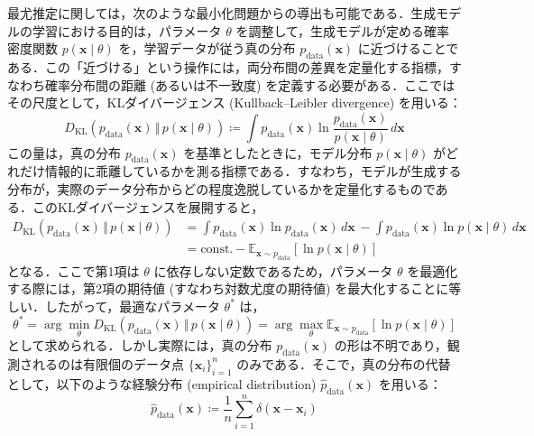 \documentclass[titlepage]{ltjsbook}
\begin{document}
最尤推定に関しては，次のような最小化問題からの導出も可能である．生成モデルの学習における目的は，パラメータ $\theta$ を調整して，生成モデルが定める確率密度関数 $p(\mathbf{x} \mid \theta)$ を，学習データが従う真の分布 $p_{\mathrm{data}}(\mathbf{x})$ に近づけることである．この「近づける」という操作には，両分布間の差異を定量化する指標，すなわち確率分布間の距離 (あるいは不一致度) を定義する必要がある．ここではその尺度として，KLダイバージェンス (Kullback–Leibler divergence) を用いる：
\begin{equation}
D_{\mathrm{KL}}\left(p_{\mathrm{data}}(\mathbf{x}) \,\Vert\, p(\mathbf{x} \mid \theta)\right)
\coloneq \int p_{\mathrm{data}}(\mathbf{x}) \ln \frac{p_{\mathrm{data}}(\mathbf{x})}{p(\mathbf{x}\mid \theta)} \, d\mathbf{x}
\end{equation}
この量は，真の分布 $p_{\mathrm{data}}(\mathbf{x})$ を基準としたときに，モデル分布 $p(\mathbf{x}\mid \theta)$ がどれだけ情報的に乖離しているかを測る指標である．すなわち，モデルが生成する分布が，実際のデータ分布からどの程度逸脱しているかを定量化するものである．このKLダイバージェンスを展開すると，
\begin{align}
D_{\mathrm{KL}}\left(p_{\mathrm{data}}(\mathbf{x}) \,\Vert\, p(\mathbf{x}\mid \theta)\right)
&= \int p_{\mathrm{data}}(\mathbf{x}) \ln p_{\mathrm{data}}(\mathbf{x}) \, d\mathbf{x} 
\ - \int p_{\mathrm{data}}(\mathbf{x}) \ln p(\mathbf{x}\mid \theta) \, d\mathbf{x} \\
&= \text{const.} - \mathbb{E}_{\mathbf{x} \sim p_{\mathrm{data}}} \left[ \ln p(\mathbf{x}\mid \theta) \right]
\end{align}
となる．ここで第1項は $\theta$ に依存しない定数であるため，パラメータ $\theta$ を最適化する際には，第2項の期待値 (すなわち対数尤度の期待値) を最大化することに等しい．したがって，最適なパラメータ $\theta^*$ は，
\begin{equation}
\theta^* = \arg\min_\theta D_{\mathrm{KL}}\left(p_{\mathrm{data}}(\mathbf{x}) \,\Vert\, p(\mathbf{x}\mid \theta)\right)
= \arg\max_\theta \mathbb{E}_{\mathbf{x} \sim p_{\mathrm{data}}} \left[ \ln p(\mathbf{x}\mid \theta) \right]
\end{equation}
として求められる．しかし実際には，真の分布 $p_{\mathrm{data}}(\mathbf{x})$ の形は不明であり，観測されるのは有限個のデータ点 $\{\mathbf{x}_i\}_{i=1}^n$ のみである．そこで，真の分布の代替として，以下のような経験分布 (empirical distribution)  $\hat{p}_{\mathrm{data}}(\mathbf{x})$ を用いる：
\begin{equation}
\hat{p}_{\mathrm{data}}(\mathbf{x}) \coloneq \frac{1}{n} \sum_{i=1}^n \delta(\mathbf{x} - \mathbf{x}_i)
\end{equation}
\end{document}
